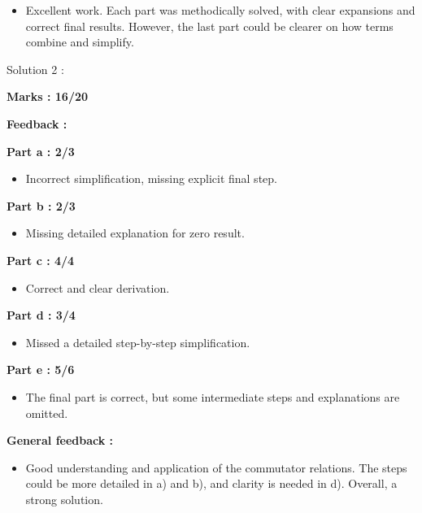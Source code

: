 \documentclass[a4paper,11pt]{article}
\begin{document}
\begin{itemize}
    \item Excellent work. Each part was methodically solved, with clear expansions and correct final results. However, the last part could be clearer on how terms combine and simplify.
\end{itemize}



Solution 2 :

\textbf{Marks : 16/20}

\textbf{Feedback :}

\textbf{Part a : 2/3}

\begin{itemize}
    \item Incorrect simplification, missing explicit final step.
\end{itemize}


\textbf{Part b : 2/3}

\begin{itemize}
    \item Missing detailed explanation for zero result.
\end{itemize}


\textbf{Part c : 4/4}

\begin{itemize}
    \item Correct and clear derivation.
\end{itemize}


\textbf{Part d : 3/4}

\begin{itemize}
    \item Missed a detailed step-by-step simplification.
\end{itemize}



\textbf{Part e : 5/6}

\begin{itemize}
    \item The final part is correct, but some intermediate steps and explanations are omitted.
\end{itemize}


\textbf{General feedback :}

\begin{itemize}
    \item Good understanding and application of the commutator relations. The steps could be more detailed in a) and b), and clarity is needed in d). Overall, a strong solution.
\end{itemize}
\end{document}
